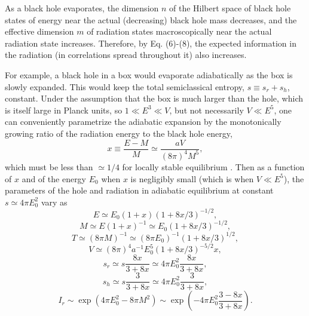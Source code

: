 	As a black hole evaporates, the dimension $n$ of the Hilbert
space of black hole states of energy near the actual (decreasing)
black hole mass decreases, and the effective dimension $m$ of
radiation states macroscopically near the actual radiation state
increases.  Therefore, by Eq. (6)-(8), the expected information in
the radiation (in correlations spread throughout it) also increases.

	For example, a black hole in a box would evaporate
adiabatically as the box is slowly expanded.  This would keep the
total semiclassical entropy, $s \equiv s_r + s_h$, constant.
Under the assumption that the box is much larger than the hole,
which is itself large in Planck units, so $1 \ll E^3 \ll V$, but not
necessarily $V \ll E^5$, one can conveniently parametrize
the adiabatic expansion by the monotonically growing ratio of
the radiation energy to the black hole energy,
	\begin{equation}
	x \equiv \frac{E-M}{M} \simeq \frac{aV}{(8\pi)^4M^5},
	\end{equation}
which must be less than $\simeq 1/4$ for locally stable equilibrium
\cite{Haw76a}.  Then as a function of $x$ and of the energy
$E_0$ when $x$ is negligibly small (which is when $V \ll E^5$),
the parameters of the hole and radiation in
adiabatic equilibrium at constant $s \simeq 4\pi E_0^2$ vary as
	\begin{equation}
	E \simeq E_0(1+x)(1+8x/3)^{-1/2},
	\end{equation}
	\begin{equation}
	M \simeq E(1+x)^{-1} \simeq E_0(1+8x/3)^{-1/2},
	\end{equation}
	\begin{equation}
	T \simeq (8\pi M)^{-1} \simeq (8\pi E_0)^{-1}(1+8x/3)^{1/2},
	\end{equation}
	\begin{equation}
	V \simeq (8\pi)^4 a^{-1} E_0^5 (1+8x/3)^{-5/2} x,
	\end{equation}
	\begin{equation}
	s_r \simeq s\frac{8x}{3+8x} \simeq 4\pi E_0^2
\frac{8x}{3+8x},
	\end{equation}
	\begin{equation}
	s_h \simeq s\frac{3}{3+8x} \simeq 4\pi E_0^2 \frac{3}{3+8x},
	\end{equation}
	\begin{equation}
	I_r \sim \exp(4\pi E_0^2 - 8\pi M^2) \sim
	 \exp(-4\pi E_0^2\frac{3-8x}{3+8x}).
	\end{equation}

